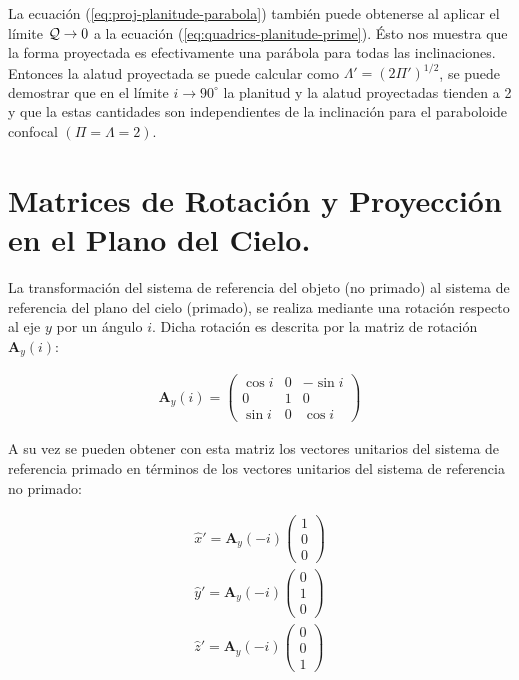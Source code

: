 La ecuación (\ref{eq:proj-planitude-parabola}) también puede obtenerse al aplicar el límite $\mathcal{Q}\to 0$ a la ecuación (\ref{eq:quadrics-planitude-prime}). Ésto nos muestra que la forma proyectada es efectivamente una parábola para todas las inclinaciones. Entonces la alatud proyectada se puede calcular como $\Lambda' = \left(2\Pi'\right)^{1/2}$, se puede demostrar que en el límite $i\to 90^\circ$ la planitud y la alatud proyectadas tienden a 2 y que la estas cantidades son independientes de la inclinación para el paraboloide confocal $(\Pi=\Lambda=2)$.

\chapter[Matrices de Rotación]{Matrices de Rotación y Proyección en el Plano del Cielo.}
\label{app:matrix}
\thispagestyle{empty}
La transformación del sistema de referencia del objeto (no primado) al sistema de referencia del plano del cielo (primado), se realiza mediante una rotación respecto al eje $y$ por un ángulo $i$. Dicha rotación es descrita por la matriz de rotación $\mathbf{A}_y(i)$:

\begin{align}
  \mathbf{A}_y(i) = \left(
  \begin{array}{ccc}
    \cos i & 0 & -\sin i \\
    0      & 1 & 0       \\
    \sin i & 0 & \cos i
  \end{array}\right)
\end{align}

A su vez se pueden obtener con esta matriz los vectores unitarios del sistema de referencia primado en términos de los vectores unitarios del sistema de referencia no primado:

\begin{align}
  \hat{x}' = \mathbf{A}_y(-i)\left(
  \begin{array}{c}
    1 \\ 0 \\ 0
  \end{array}\right)\\
  \hat{y}' = \mathbf{A}_y(-i)\left(
  \begin{array}{c}
    0 \\ 1 \\ 0
  \end{array} \right)\\
  \hat{z}' = \mathbf{A}_y(-i)\left(
  \begin{array}{c}
    0 \\ 0 \\ 1
  \end{array}\right) \label{eq:y-matrix}
\end{align}


